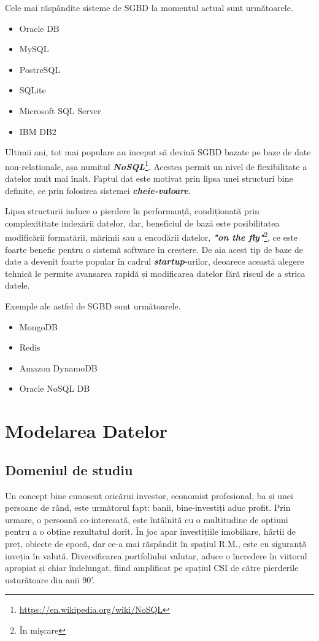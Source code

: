\documentclass[12pt. a4paper]{report}
\begin{document}
Cele mai răspândite sisteme de SGBD la momentul actual sunt următoarele.
\begin{itemize}
	\item Oracle DB
	\item MySQL
	\item PostreSQL
	\item SQLite
	\item Microsoft SQL Server
	\item IBM DB2
\end{itemize}

Ultimii ani, tot mai populare au inceput să devină SGBD bazate pe baze de date non-relaționale, așa numitul \emph{\textbf{NoSQL}}\footnote{\url{https://en.wikipedia.org/wiki/NoSQL}}. Acestea permit un nivel de flexibilitate a datelor mult mai înalt. Faptul dat este motivat prin lipsa unei structuri bine definite, ce prin folosirea sistemei \emph{\textbf{cheie-valoare}}.

Lipsa structurii induce o pierdere în performanță, condiționată prin complexititate indexării datelor, dar, beneficiul de bază este posibilitatea modificării formatării, mărimii sau a encodării datelor, \emph{\textbf{"on the fly"}}\footnote{În mișcare}, ce este foarte benefic pentru o sistemă software în creștere. De aia acest tip de baze de date a devenit foarte popular în cadrul \emph{\textbf{startup}}-urilor, deoarece această alegere tehnică le permite avansarea rapidă și modificarea datelor fără riscul de a strica datele.

Exemple ale astfel de SGBD sunt următoarele.
\begin{itemize}
	\item MongoDB
	\item Redis
	\item Amazon DynamoDB
	\item Oracle NoSQL DB
\end{itemize}

\chapter{Modelarea Datelor}

\section{Domeniul de studiu}

Un concept bine cunoscut oricărui investor, economist profesional, ba și unei persoane de rând, este următorul fapt: banii, bine-investiți aduc profit. Prin urmare, o persoană co-interesată, este întâlnită cu o multitudine de opțiuni pentru a o obține rezultatul dorit. În joc apar investițiile imobiliare, hârtii de preț, obiecte de epocă, dar ce-a mai răspândit în spațiul R.M., este cu siguranță inveția în valută. Diversificarea portfoliului valutar, aduce o încredere în viitorul apropiat și chiar îndelungat, fiind amplificat pe spațiul CSI de către pierderile usturătoare din anii 90'.
\end{document}
